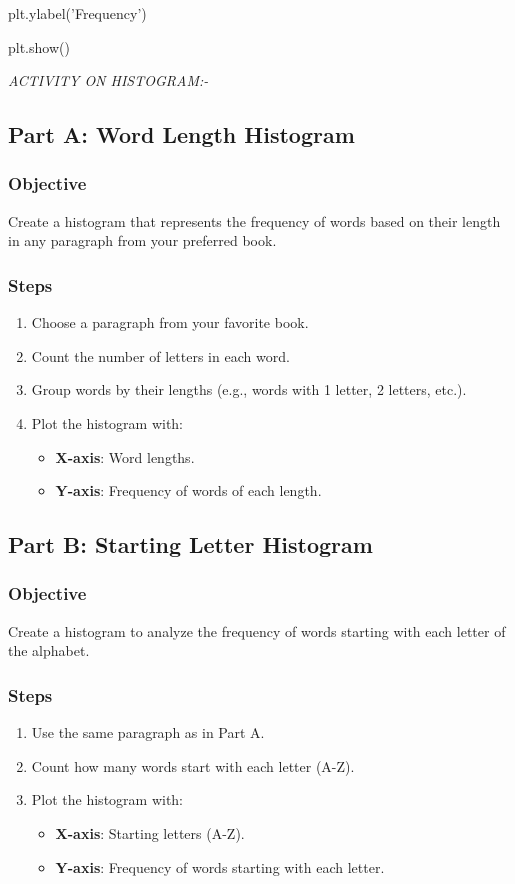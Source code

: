 \documentclass{report}
\begin{document}
plt.ylabel('Frequency')

plt.show()


\setlength{\parskip}{1em}

\textit{ACTIVITY ON HISTOGRAM:- }

\subsection{Part A: Word Length Histogram}
\subsubsection*{Objective}
Create a histogram that represents the frequency of words based on their length in any paragraph from your preferred book.

\subsubsection*{Steps}
\begin{enumerate}
    \item Choose a paragraph from your favorite book.
    \item Count the number of letters in each word.
    \item Group words by their lengths (e.g., words with 1 letter, 2 letters, etc.).
    \item Plot the histogram with:
    \begin{itemize}
        \item \textbf{X-axis}: Word lengths.
        \item \textbf{Y-axis}: Frequency of words of each length.
    \end{itemize}
\end{enumerate} 

\subsection{Part B: Starting Letter Histogram}
\subsubsection*{Objective}
Create a histogram to analyze the frequency of words starting with each letter of the alphabet.

\subsubsection*{Steps}
\begin{enumerate}
    \item Use the same paragraph as in Part A.
    \item Count how many words start with each letter (A-Z).
    \item Plot the histogram with:
    \begin{itemize}
        \item \textbf{X-axis}: Starting letters (A-Z).
        \item \textbf{Y-axis}: Frequency of words starting with each letter.
    \end{itemize}
\end{enumerate}
\end{document}
